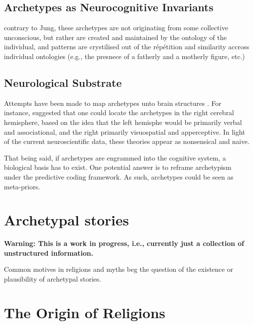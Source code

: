 \documentclass[]{book}
\begin{document}
\hypertarget{archetypes-as-neurocognitive-invariants}{%
\section{Archetypes as Neurocognitive Invariants}\label{archetypes-as-neurocognitive-invariants}}

contrary to Jung, these archetypes are not originating from some collective unconscious, but rather are created and maintained by the ontology of the individual, and patterns are crystilised out of the répétition and similarity accross individual ontologies (e.g., the presnece of a fatherly and a motherly figure, etc.)

\hypertarget{neurological-substrate}{%
\section{Neurological Substrate}\label{neurological-substrate}}

Attempts have been made to map archetypes unto brain structures \citep{samuels2003jung}. For instance, \citet{rossi1977cerebral} suggested that one could locate the archetypes in the right cerebral hemisphere, based on the idea that the left hemisphe would be primarily verbal and associational, and the right primarily visuospatial and apperceptive. In light of the current neuroscientific data, these theories appear as nonsensical and naive.

That being said, if archetypes are engrammed into the cognitive system, a biological basis has to exist. One potential answer is to reframe archetypism under the predictive coding framework. As such, archetypes could be seen as meta-priors.

\hypertarget{archetypal-stories}{%
\chapter{Archetypal stories}\label{archetypal-stories}}

\textbf{Warning: This is a work in progress, i.e., currently just a collection of unstructured information.}

Common motives in religions and myths beg the question of the existence or plausibility of archetypal stories.

\hypertarget{the-origin-of-religions}{%
\chapter{The Origin of Religions}\label{the-origin-of-religions}}
\end{document}
